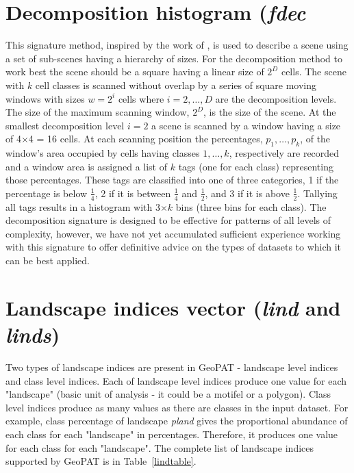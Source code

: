 \section{Decomposition histogram ({\it fdec}}

This signature method, inspired by the work of \cite{Remmel2006}, is used to describe a scene using a set of sub-scenes having a hierarchy of sizes. 
For the decomposition method to work best the scene should be a square having a linear size of $2^{D}$ cells.
The scene with $k$ cell classes is scanned without overlap by a series of square moving windows with sizes $w=2^{i}$ cells where $i=2, \ldots, D$ are the decomposition levels. 
The size of the maximum scanning window, $2^D$, is the size of the scene. 
At the smallest decomposition level $i=2$ a scene is scanned by a window having a size of 4$\times$4 = 16 cells. 
At each scanning position the percentages, ${p_1, \ldots, p_k}$, of the window's area occupied by cells having classes ${1, \ldots, k}$, respectively are recorded and a window area is assigned a list of $k$ tags (one for each class) representing those percentages. 
These tags are classified into one of three categories, 1 if the percentage is below $\frac{1}{4}$, 2 if it is between $\frac{1}{4}$ and $\frac{1}{2}$, and 3 if it is above $\frac{1}{2}$. 
Tallying all tags results in a histogram with 3$\times k$ bins (three bins for each class).  
The decomposition signature is designed to be effective for patterns of all levels of complexity, however, we have not yet accumulated sufficient experience working with this signature to offer definitive advice on the types of datasets to which it can be best applied. 

% 

\section{Landscape indices vector ({\it lind} and {\it linds})}

Two types of landscape indices are present in GeoPAT - landscape level indices and class level indices.
Each of landscape level indices produce one value for each "landscape" (basic unit of analysis - it could be a motifel or a polygon).
Class level indices produce as many values as there are classes in the input dataset.
For example, class percentage of landscape {\it pland} gives the proportional abundance of each class for each "landscape" in percentages.
Therefore, it produces one value for each class for each "landscape". 
The complete list of landscape indices supported by GeoPAT is in Table~\ref{lindtable}.

